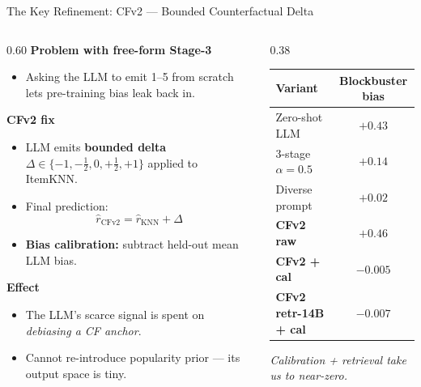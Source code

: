 \documentclass[aspectratio=169,10pt]{beamer}
\newcommand{\good}[1]{\textcolor{goodgreen}{\textbf{#1}}}
\newcommand{\bad}[1]{\textcolor{badred}{\textbf{#1}}}
\newcommand{\cf}[1]{\textcolor{cfblue}{\textbf{#1}}}
\begin{document}
\begin{frame}{The Key Refinement: CFv2 — Bounded Counterfactual Delta}
  \begin{columns}[T,onlytextwidth]
    \begin{column}{0.60\textwidth}
      \textbf{Problem with free-form Stage-3}
      \begin{itemize}
        \item Asking the LLM to emit 1--5 from scratch lets pre-training bias leak back in.
      \end{itemize}
      \textbf{CFv2 fix}
      \begin{itemize}
        \item LLM emits \cf{bounded delta}
              $\Delta \in \{-1, -\tfrac12, 0, +\tfrac12, +1\}$
              applied to ItemKNN.
        \item Final prediction:
              \vspace{-0.3em}
              \[\hat r_{\text{CFv2}} = \hat r_{\text{KNN}} + \Delta\]
        \item \cf{Bias calibration:}
              subtract held-out mean LLM bias.
      \end{itemize}
      \textbf{Effect}
      \begin{itemize}
        \item The LLM's scarce signal is spent on \emph{debiasing a CF anchor}.
        \item Cannot re-introduce popularity prior — its output space is tiny.
      \end{itemize}
    \end{column}
    \begin{column}{0.38\textwidth}
      \centering
      \begin{tabular}{lc}
        \toprule
        Variant & Blockbuster bias \\ \midrule
        Zero-shot LLM       & \bad{$+0.43$} \\
        3-stage $\alpha{=}0.5$ & $+0.14$ \\
        Diverse prompt      & $+0.02$ \\
        \bad{CFv2 raw}      & \bad{$+0.46$} \\
        \good{CFv2 + cal}   & \good{$-0.005$} \\
        \good{CFv2 retr-14B + cal} & \good{$-0.007$} \\
        \bottomrule
      \end{tabular}
      \vspace{0.6em}
      \footnotesize{\emph{Calibration + retrieval take us to near-zero.}}
    \end{column}
  \end{columns}
\end{frame}
\end{document}
